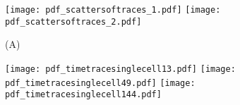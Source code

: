 \clearpage



\begin{figure}%
	\centering
	\texttt{[image: pdf\_scattersoftraces\_1.pdf]}
	\texttt{[image: pdf\_scattersoftraces\_2.pdf]}	
	\caption{ 
		(A) 
	}
	\label{fig:CRP:XXX}
\end{figure}%

\begin{figure}%
	\centering
	\texttt{[image: pdf\_timetracesinglecell13.pdf]}
	\texttt{[image: pdf\_timetracesinglecell49.pdf]}
	\texttt{[image: pdf\_timetracesinglecell144.pdf]}
	\clearpage %
	\label{fig:XXX:XXX}
\end{figure}	

\clearpage




